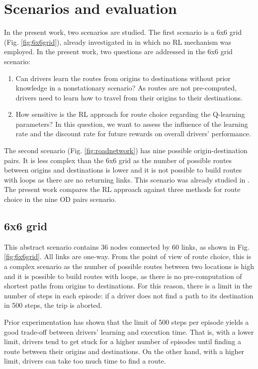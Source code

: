 \documentclass{RITA}
\begin{document}
\section{Scenarios and evaluation}
\label{sec:scenario}
In the present work, two scenarios are studied. The first scenario is a 6x6 grid (Fig. \ref{fig:6x6grid}), already investigated in \cite{Bazzan+2007alag,Bazzan+2008alamas} in which no RL mechanism was employed. In the present work, two questions are addressed in the 6x6 grid scenario:

\begin{enumerate}
  \item Can drivers learn the routes from origins to destinations without prior knowledge in a nonstationary scenario? As routes are not pre-computed, drivers need to learn how to travel from their origins to their destinations.
  \item How sensitive is the RL approach for route choice regarding the Q-learning parameters? In this question, we want to assess the influence of the learning rate and the discount rate for future rewards on overall drivers' performance.
\end{enumerate}

The second scenario (Fig. \ref{fig:roadnetwork}) has nine possible origin-destination pairs. It is less complex than the 6x6 grid as the number of possible routes between origins and destinations is lower and it is not possible to build routes with loops as there are no returning links. This scenario was already studied in \cite{Tavares&Bazzan2012,Galib&Moser2011}. The present work compares the RL approach against three methods for route choice in the nine OD pairs scenario.

\subsection{6x6 grid}
\label{sec:gridDescription}
This abstract scenario contains 36 nodes connected by 60 links, as shown in Fig. \ref{fig:6x6grid}. All links are one-way. From the point of view of route choice, this is a complex scenario as the number of possible routes between two locations is high and it is possible to build routes with loops, as there is no pre-computation of shortest paths from origins to destinations. For this reason, there is a limit in the number of steps in each episode: if a driver does not find a path to its destination in 500 steps, the trip is aborted.

Prior experimentation has shown that the limit of 500 steps per episode yields a good trade-off between drivers' learning and execution time. That is, with a lower limit, drivers tend to get stuck for a higher number of episodes until finding a route between their origins and destinations. On the other hand, with a higher limit, drivers can take too much time to find a route.
\end{document}
